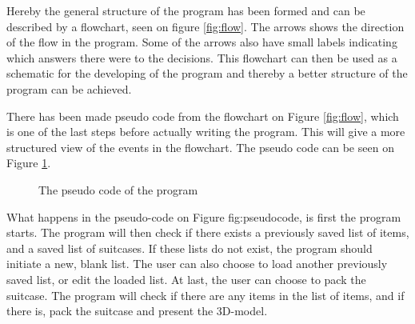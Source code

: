 
Hereby the general structure of the program has been formed and can be described by a flowchart, seen on figure \ref{fig:flow}.
The arrows shows the direction of the flow in the program. Some of the arrows also have small labels indicating which answers there were to the decisions.
This flowchart can then be used as a schematic for the developing of the program and thereby a better structure of the program can be achieved.

There has been made pseudo code from the flowchart on Figure \ref{fig:flow}, which is one of the last steps before actually writing the program. This will give a more structured view of the events in the flowchart. The pseudo code can be seen on Figure \ref{fig:pseudocode}.

\begin{figure}[H] \centering
			
\caption{The pseudo code of the program}\label{fig:pseudocode}
\end{figure}

What happens in the pseudo-code on Figure {fig:pseudocode}, is first the program starts. The program will then check if there exists a previously saved list of items, and a saved list of suitcases. If these lists do not exist, the program should initiate a new, blank list. The user can also choose to load another previously saved list, or edit the loaded list. At last, the user can choose to pack the suitcase. The program will check if there are any items in the list of items, and if there is, pack the suitcase and present the 3D-model. 
